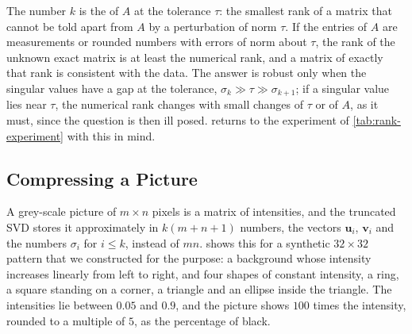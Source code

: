 The number $k$ is the  of $A$ at the tolerance $\tau$: the smallest rank of a matrix that cannot be told apart from $A$ by a perturbation of norm $\tau$. If the entries of $A$ are measurements or rounded numbers with errors of norm about $\tau$, the rank of the unknown exact matrix is at least the numerical rank, and a matrix of exactly that rank is consistent with the data. The answer is robust only when the singular values have a gap at the tolerance, $\sigma_k\gg\tau\gg\sigma_{k+1}$; if a singular value lies near $\tau$, the numerical rank changes with small changes of $\tau$ or of $A$, as it must, since the question is then ill posed.  returns to the experiment of \cref{tab:rank-experiment} with this in mind.

\subsection{Compressing a Picture}

A grey-scale picture of $m\times n$ pixels is a matrix of intensities, and the truncated SVD stores it approximately in $k(m+n+1)$ numbers, the vectors $\mathbf u_i$, $\mathbf v_i$ and the numbers $\sigma_i$ for $i\le k$, instead of $mn$.  shows this for a synthetic $32\times32$ pattern that we constructed for the purpose: a background whose intensity increases linearly from left to right, and four shapes of constant intensity, a ring, a square standing on a corner, a triangle and an ellipse inside the triangle. The intensities lie between $0.05$ and $0.9$, and the picture shows $100$ times the intensity, rounded to a multiple of $5$, as the percentage of black.

